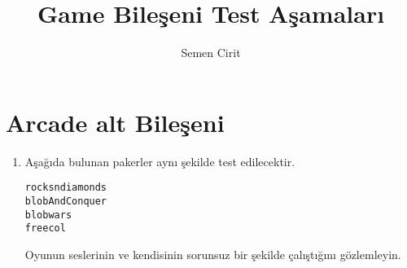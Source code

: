 \documentclass[a4paper,10pt]{article}
\title{Game Bileşeni Test Aşamaları}
\author{Semen Cirit}
\begin{document}
\maketitle

\section{Arcade alt Bileşeni}
\begin{enumerate}
\item Aşağıda bulunan pakerler aynı şekilde test edilecektir. 
\begin{verbatim}
rocksndiamonds 
blobAndConquer
blobwars
freecol
\end{verbatim}

Oyunun seslerinin ve kendisinin sorunsuz bir şekilde çalıştığını gözlemleyin.	
\end{enumerate}
\end{document}
